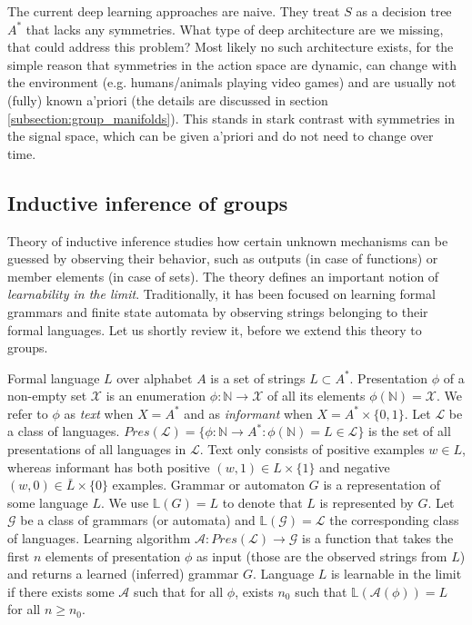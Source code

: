 \documentclass[12pt]{article}
\begin{document}
The current deep learning approaches are naive. They treat $S$ as a decision tree $A^*$ that lacks any symmetries. What type of deep architecture are we missing, that could address this problem? Most likely no such architecture exists, for the simple reason that symmetries in the action space are dynamic, can change with the environment (e.g. humans/animals playing video games) and are usually not (fully) known a'priori (the details are discussed in section \ref{subsection:group_manifolds}). This stands in stark contrast with symmetries in the signal space, which can be given a'priori and do not need to change over time.


\subsection{Inductive inference of groups}
Theory of inductive inference \cite{deLaHiguera,SOLOMONOFF19641} studies how certain unknown mechanisms can be guessed by observing their behavior, such as outputs (in case of functions) or member elements (in case of sets). The theory defines an important notion of \textit{learnability in the limit}. Traditionally, it has been focused on learning formal grammars and finite state automata by observing strings belonging to their formal languages. Let us shortly review it, before we extend this theory to groups. 

Formal language $L$ over alphabet $A$ is a set of strings $L\subset A^*$. Presentation $\phi$ of a non-empty set $\mathcal{X}$ is an enumeration $\phi:\mathbb{N}\rightarrow \mathcal{X}$ of all its elements $\phi(\mathbb{N})=\mathcal{X}$. We refer to $\phi$ as \textit{text} when $X=A^*$ and as \textit{informant} when $X=A^*\times \{0,1\}$. Let $\mathcal{L}$ be a class of languages.
 $Pres(\mathcal{L})=\{\phi:\mathbb{N}\rightarrow A^* : \phi(\mathbb{N}) = L \in \mathcal{L}\}$ is the set of all presentations of all languages in $\mathcal{L}$. Text only consists of positive examples $w\in L$, whereas informant has both positive $(w,1) \in L \times \{1\}$ and negative $(w,0) \in \bar{L} \times \{0\}$ examples. Grammar or automaton $G$ is a representation of some language $L$. We use $\mathbb{L}(G)=L$ to denote that $L$ is represented by $G$. Let $\mathcal{G}$ be a class of grammars (or automata) and $\mathbb{L}(\mathcal{G})=\mathcal{L}$ the corresponding class of languages. Learning algorithm $\mathcal{A}:Pres(\mathcal{L})\rightarrow\mathcal{G}$ is a function that takes the first $n$ elements of presentation $\phi$ as input (those are the observed strings from $L$) and returns a learned (inferred) grammar $G$. Language $L$ is learnable in the limit if there exists some $\mathcal{A}$ such that for all $\phi$, exists $n_0$ such that $\mathbb{L}(\mathcal{A}(\phi))=L$ for all $n \ge n_0$.  
\end{document}
